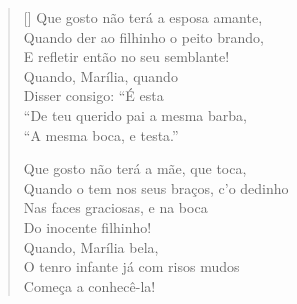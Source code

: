 \documentclass[12pt]{book}
\begin{document}
\begin{enumerate}
\begin{verse}[\versewidth]
						Que gosto não terá a esposa amante, \\
						Quando der ao filhinho o peito brando, \\
						E refletir então no seu semblante! \\
						\hspace{2em} Quando, Marília, quando \\
						\hspace{2em} Disser consigo: “É esta \\
						“De teu querido pai a mesma barba, \\
						\hspace{2em} “A mesma boca, e testa.”
						
						Que gosto não terá a mãe, que toca, \\
						Quando o tem nos seus braços, c’o dedinho \\
						Nas faces graciosas, e na boca \\
						\hspace{2em} Do inocente filhinho! \\
						\hspace{2em} Quando, Marília bela, \\
						O tenro infante já com risos mudos \\
						\hspace{2em} Começa a conhecê-la!
						

\end{verse}
\end{enumerate}
\end{document}
